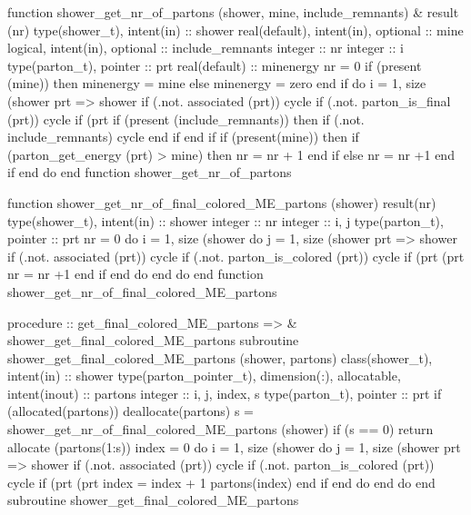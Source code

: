 \eatline
\nwendcode{}\nwdocspar
\nwenddocs{}\plusendmoddef
  function shower_get_nr_of_partons (shower, mine, include_remnants) &
       result (nr)
    type(shower_t), intent(in) :: shower
    real(default), intent(in), optional :: mine
    logical, intent(in), optional :: include_remnants
    integer :: nr
    integer :: i
    type(parton_t), pointer :: prt
    real(default) :: minenergy
    nr = 0
    if (present (mine)) then
       minenergy = mine
    else
       minenergy = zero
    end if
    do i = 1, size (shower%
       prt => shower%
       if (.not. associated (prt)) cycle
       if (.not. parton_is_final (prt)) cycle
       if (prt%
          if (present (include_remnants)) then
             if (.not. include_remnants) cycle
          end if
       end if
       if (present(mine)) then
          if (parton_get_energy (prt) > mine) then
             nr = nr + 1
          end if
       else
          nr = nr +1
       end if
    end do
  end function shower_get_nr_of_partons

\eatline
\nwendcode{}\nwdocspar
\nwenddocs{}\plusendmoddef
  function shower_get_nr_of_final_colored_ME_partons (shower) result(nr)
    type(shower_t), intent(in) :: shower
    integer :: nr
    integer :: i, j
    type(parton_t), pointer :: prt
    nr = 0
    do i = 1, size (shower%
       do j = 1, size (shower%
          prt => shower%
          if (.not. associated (prt)) cycle
          if (.not. parton_is_colored (prt)) cycle
          if (prt%
               (prt%
             nr = nr +1
          end if
       end do
    end do
  end function shower_get_nr_of_final_colored_ME_partons

\eatline
\nwendcode{}\nwdocspar
\nwenddocs{}\plusendmoddef
  procedure :: get_final_colored_ME_partons => &
       shower_get_final_colored_ME_partons
\nwendcode{}\plusendmoddef
  subroutine shower_get_final_colored_ME_partons (shower, partons)
    class(shower_t), intent(in) :: shower
    type(parton_pointer_t), dimension(:), allocatable, intent(inout) :: partons
    integer :: i, j, index, s
    type(parton_t), pointer :: prt
    if (allocated(partons))  deallocate(partons)
    s = shower_get_nr_of_final_colored_ME_partons (shower)
    if (s == 0) return
    allocate (partons(1:s))
    index = 0
    do i = 1, size (shower%
       do j = 1, size (shower%
          prt => shower%
          if (.not. associated (prt)) cycle
          if (.not. parton_is_colored (prt)) cycle
          if (prt%
               (prt%
             index = index + 1
             partons(index)%
          end if
       end do
    end do
  end subroutine shower_get_final_colored_ME_partons

